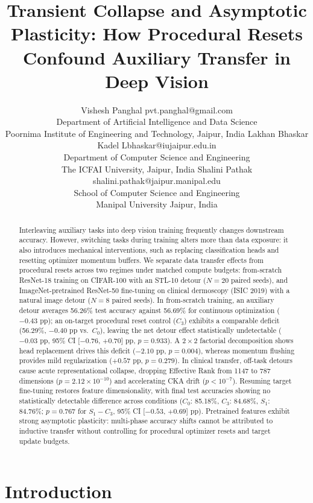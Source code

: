 \documentclass[10pt]{article}
\title{Transient Collapse and Asymptotic Plasticity: How Procedural Resets Confound Auxiliary Transfer in Deep Vision}
\author{\name Vishesh Panghal \email pvt.panghal@gmail.com \\
      \addr Department of Artificial Intelligence and Data Science\\
      Poornima Institute of Engineering and Technology, Jaipur, India
      \AND
      \name Lakhan Bhaskar Kadel \email Lbhaskar@iujaipur.edu.in \\
      \addr Department of Computer Science and Engineering\\
      The ICFAI University, Jaipur, India
      \AND
      \name Shalini Pathak \email shalini.pathak@jaipur.manipal.edu \\
      \addr School of Computer Science and Engineering\\
      Manipal University Jaipur, India}
\begin{document}
\maketitle

\begin{abstract}
Interleaving auxiliary tasks into deep vision training frequently changes downstream accuracy. However, switching tasks during training alters more than data exposure: it also introduces mechanical interventions, such as replacing classification heads and resetting optimizer momentum buffers. We separate data transfer effects from procedural resets across two regimes under matched compute budgets: from-scratch ResNet-18 training on CIFAR-100 with an STL-10 detour ($N = 20$ paired seeds), and ImageNet-pretrained ResNet-50 fine-tuning on clinical dermoscopy (ISIC 2019) with a natural image detour ($N = 8$ paired seeds). In from-scratch training, an auxiliary detour averages 56.26\% test accuracy against 56.69\% for continuous optimization ($-0.43$ pp); an on-target procedural reset control ($C_3$) exhibits a comparable deficit (56.29\%, $-0.40$ pp vs.\ $C_0$), leaving the net detour effect statistically undetectable ($-0.03$ pp, 95\% CI [$-0.76$, $+0.70$] pp, $p = 0.933$). A $2 \times 2$ factorial decomposition shows head replacement drives this deficit ($-2.10$ pp, $p = 0.004$), whereas momentum flushing provides mild regularization ($+0.57$ pp, $p = 0.279$). In clinical transfer, off-task detours cause acute representational collapse, dropping Effective Rank from 1147 to 787 dimensions ($p = 2.12 \times 10^{-10}$) and accelerating CKA drift ($p < 10^{-7}$). Resuming target fine-tuning restores feature dimensionality, with final test accuracies showing no statistically detectable difference across conditions ($C_0$: 85.18\%, $C_3$: 84.68\%, $S_1$: 84.76\%; $p = 0.767$ for $S_1 - C_3$, 95\% CI [$-0.53$, $+0.69$] pp). Pretrained features exhibit strong asymptotic plasticity: multi-phase accuracy shifts cannot be attributed to inductive transfer without controlling for procedural optimizer resets and target update budgets.
\end{abstract}

\section{Introduction}\label{sec:intro}
\end{document}
